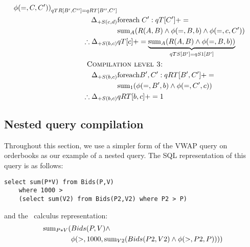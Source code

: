 \begin{example}
\begin{align*}
{  \phi(=,C,C'))}_{qTR[B',C''] = qRT[B'',C']}
\\
\Delta_{+S(c,d)} & \algforeach \; C': qT[C'] += \\
& \algsum_{A}(R(A,B) \wedge \phi(=,B,b) \wedge \phi(=,c,C'))\\
\therefore \Delta_{+S(b,c)} & qT[c] +=
\underbrace{\algsum_{A}(R(A,B) \wedge \phi(=,B,b))}_{qTS[B'] = qS1[B']}
\\
& \hspace{-1.5cm}\mbox{\sc Compilation level 3:}\\
\Delta_{+S(b,c)} & \algforeach B',C': qRT[B',C'] += \\
& \algsum_{1}(\phi(=,B',b) \wedge \phi(=,C',c))
\\
\therefore \Delta_{+S(b,c)} & qRT[b,c] += 1
\end{align*}
\end{example}


\subsection{Nested query compilation}
Throughout this section, we use a simpler form of the VWAP query on orderbooks
as our example of a nested query. The SQL representation of this query is as
follows:

\begin{verbatim}
select sum(P*V) from Bids(P,V)
    where 1000 >
    (select sum(V2) from Bids(P2,V2) where P2 > P)
\end{verbatim}

and the \compiler\ calculus representation:
\begin{align*}
\mathrm{sum}_{P*V}(& Bids(P,V) \wedge \\
& \phi(>, 1000, \mathrm{sum}_{V2}(Bids(P2,V2) \wedge \phi(>,P2,P))))
\end{align*}

